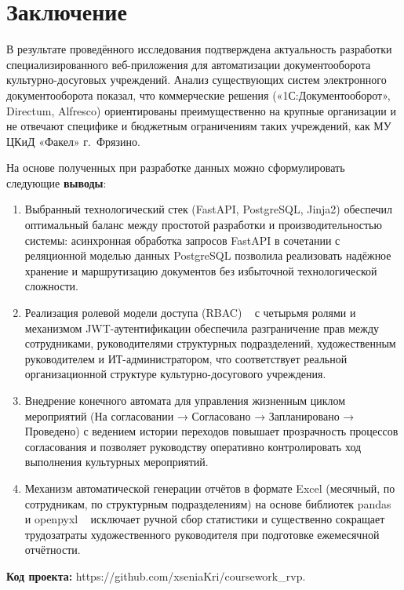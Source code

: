 \section*{Заключение}
В результате проведённого исследования подтверждена актуальность разработки
специализированного веб-приложения для автоматизации документооборота культурно-досуговых
учреждений. Анализ существующих систем электронного документооборота показал, что
коммерческие решения («1С:Документооборот», Directum, Alfresco) ориентированы
преимущественно на крупные организации и не отвечают специфике и бюджетным
ограничениям таких учреждений, как МУ ЦКиД «Факел» г.~Фрязино.

На основе полученных при разработке данных можно сформулировать следующие
\textbf{выводы}:
\begin{enumerate}
    \item Выбранный технологический стек (FastAPI, PostgreSQL, Jinja2)
    обеспечил оптимальный баланс между простотой разработки и производительностью системы:
    асинхронная обработка запросов FastAPI в сочетании с реляционной моделью данных
    PostgreSQL позволила реализовать надёжное хранение и маршрутизацию документов
    без избыточной технологической сложности.
    \item Реализация ролевой модели доступа (RBAC) ~\cite{rbac} с четырьмя ролями и механизмом
    JWT-аутентификации обеспечила разграничение прав между сотрудниками, руководителями
    структурных подразделений, художественным руководителем и ИТ-администратором,
    что соответствует реальной организационной структуре культурно-досугового учреждения.
    \item Внедрение конечного автомата для управления жизненным циклом мероприятий
    (На согласовании → Согласовано → Запланировано → Проведено) с ведением истории
    переходов повышает прозрачность процессов согласования и позволяет руководству
    оперативно контролировать ход выполнения культурных мероприятий.
    \item Механизм автоматической генерации отчётов в формате Excel (месячный,
    по сотрудникам, по структурным подразделениям) на основе библиотек pandas ~\cite{pandas} и openpyxl ~\cite{openpyxl}
    исключает ручной сбор статистики и существенно сокращает трудозатраты
    художественного руководителя при подготовке ежемесячной отчётности.
\end{enumerate}

\textbf{Код проекта:} https://github.com/xseniaKri/coursework\_rvp.

